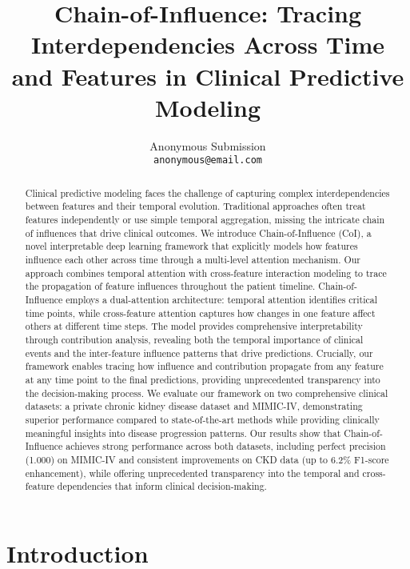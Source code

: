 \documentclass[letterpaper]{article}
\title{Chain-of-Influence: Tracing Interdependencies Across Time and Features in Clinical Predictive Modeling}
\author{
    Anonymous Submission\\
    \texttt{anonymous@email.com}
}
\begin{document}
\maketitle

\begin{abstract}
Clinical predictive modeling faces the challenge of capturing complex interdependencies between features and their temporal evolution. Traditional approaches often treat features independently or use simple temporal aggregation, missing the intricate chain of influences that drive clinical outcomes. We introduce Chain-of-Influence (CoI), a novel interpretable deep learning framework that explicitly models how features influence each other across time through a multi-level attention mechanism. Our approach combines temporal attention with cross-feature interaction modeling to trace the propagation of feature influences throughout the patient timeline. Chain-of-Influence employs a dual-attention architecture: temporal attention identifies critical time points, while cross-feature attention captures how changes in one feature affect others at different time steps. The model provides comprehensive interpretability through contribution analysis, revealing both the temporal importance of clinical events and the inter-feature influence patterns that drive predictions. Crucially, our framework enables tracing how influence and contribution propagate from any feature at any time point to the final predictions, providing unprecedented transparency into the decision-making process. We evaluate our framework on two comprehensive clinical datasets: a private chronic kidney disease dataset and MIMIC-IV, demonstrating superior performance compared to state-of-the-art methods while providing clinically meaningful insights into disease progression patterns. Our results show that Chain-of-Influence achieves strong performance across both datasets, including perfect precision (1.000) on MIMIC-IV and consistent improvements on CKD data (up to 6.2\% F1-score enhancement), while offering unprecedented transparency into the temporal and cross-feature dependencies that inform clinical decision-making.
\end{abstract}

\begin{links}
\end{links}

\section{Introduction}
\end{document}
